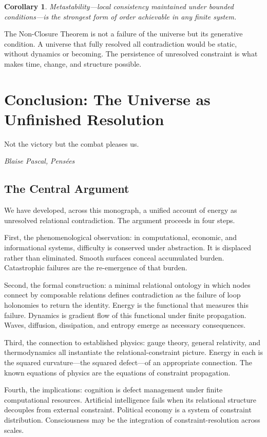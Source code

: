 \documentclass[12pt,a4paper,openany]{book}
\theoremstyle{plain}
\newtheorem{corollary}[theorem]{Corollary}
\theoremstyle{definition}
\theoremstyle{remark}
\begin{document}
\begin{corollary}
Metastability---local consistency maintained under bounded conditions---is the strongest form of order achievable in any finite system.
\end{corollary}

The Non-Closure Theorem is not a failure of the universe but its generative condition. A universe that fully resolved all contradiction would be static, without dynamics or becoming. The persistence of unresolved constraint is what makes time, change, and structure possible.

\chapter{Conclusion: The Universe as Unfinished Resolution}

\epigraph{%
  Not the victory but the combat pleases us.
}{%
  \textit{Blaise Pascal,} \textit{Pensées}}

\section{The Central Argument}

We have developed, across this monograph, a unified account of energy as unresolved relational contradiction. The argument proceeds in four steps.

First, the phenomenological observation: in computational, economic, and informational systems, difficulty is conserved under abstraction. It is displaced rather than eliminated. Smooth surfaces conceal accumulated burden. Catastrophic failures are the re-emergence of that burden.

Second, the formal construction: a minimal relational ontology in which nodes connect by composable relations defines contradiction as the failure of loop holonomies to return the identity. Energy is the functional that measures this failure. Dynamics is gradient flow of this functional under finite propagation. Waves, diffusion, dissipation, and entropy emerge as necessary consequences.

Third, the connection to established physics: gauge theory, general relativity, and thermodynamics all instantiate the relational-constraint picture. Energy in each is the squared curvature---the squared defect---of an appropriate connection. The known equations of physics are the equations of constraint propagation.

Fourth, the implications: cognition is defect management under finite computational resources. Artificial intelligence fails when its relational structure decouples from external constraint. Political economy is a system of constraint distribution. Consciousness may be the integration of constraint-resolution across scales.
\end{document}
